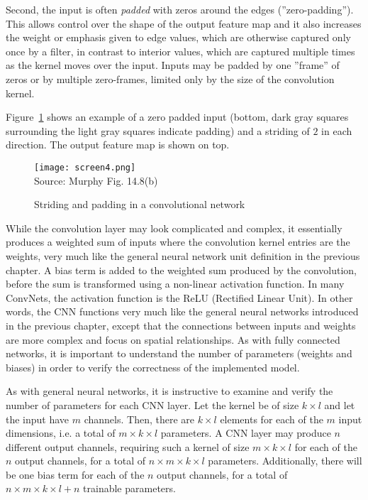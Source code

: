 Second, the input is often \emph{padded} with zeros around the edges (''zero-padding''). This allows control over the shape of the output feature map and it also increases the weight or emphasis given to edge values, which are otherwise captured only once by a filter, in contrast to interior values, which are captured multiple times as the kernel moves over the input. Inputs may be padded by one ''frame'' of zeros or by multiple zero-frames, limited only by the size of the convolution kernel.

Figure~\ref{fig:screen4_chap16} shows an example of a zero padded input (bottom, dark gray squares surrounding the light gray squares indicate padding) and a striding of $2$ in each direction. The output feature map is shown on top.  

\begin{figure}
\centering
\texttt{[image: screen4.png]} \\

\scriptsize Source: Murphy Fig. 14.8(b)
\caption{Striding and padding in a convolutional network}
\label{fig:screen4_chap16}
\end{figure}

While the convolution layer may look complicated and complex, it essentially produces a weighted sum of inputs where the convolution kernel entries are the weights, very much like the general neural network unit definition in the previous chapter. A bias term is added to the weighted sum produced by the convolution, before the sum is transformed using a non-linear activation function. In many ConvNets, the activation function is the ReLU (Rectified Linear Unit). In other words, the CNN functions very much like the general neural networks introduced in the previous chapter, except that the connections between inputs and weights are more complex and focus on spatial relationships. As with fully connected networks, it is important to understand the number of parameters (weights and biases) in order to verify the correctness of the implemented model.

As with general neural networks, it is instructive to examine and verify the number of parameters for each CNN layer. Let the kernel be of size $k \times l$ and let the input have $m$ channels. Then, there are $k \times l$ elements for each of the $m$ input dimensions, i.e. a total of $m \times k \times l$ parameters. A CNN layer may produce $n$ different output channels, requiring such a kernel of size $m \times k \times l$ for each of the $n$ output channels, for a total of $n \times m \times k \times l$ parameters. Additionally, there will be one bias term for each of the $n$ output channels, for a total of $n \times m \times k \times l + n$ trainable parameters. \\

